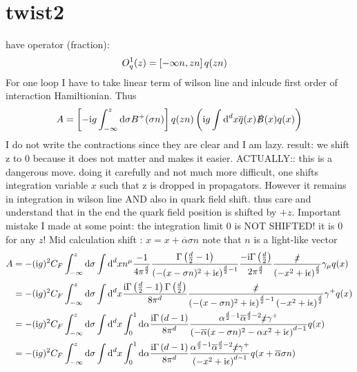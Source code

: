 \ifdefined\mainprogram{}
\else

\fi

\section{twist2}
have operator (fraction):
\begin{align}
O_q^{1}(z) 
&=
\left[-\infty n ,zn \right] q(zn)
\end{align}
For one loop I have to take linear term of wilson line and inlcude first order of interaction Hamiltionian. Thus
\begin{align}
	A=\left[-\text{i} g \int_{-\infty}^ {z} \text{d} \sigma B^+(\sigma n)\right] q(zn) \left(\text{i} g \int \text{d} ^d x \overline q(x) \slashed {B} (x) q(x)\right)
\end{align}
I do not write the contractions since they are clear and I am lazy. result: 
we shift z to 0 because it does not matter  and makes it easier. ACTUALLY:: this is a dangerous move. doing it carefully and not much more difficult, one shifts integration variable $x$ such that z is  dropped in propagators. However it remains in integration in wilson line AND also in quark field shift. thus care and understand that in the end the quark field position is shifted by $+z$. Important mistake I made at some point: the integration limit $0$ is NOT SHIFTED! it is $0$ for any $z$! Mid calculation shift : $x = x + \overline\alpha \sigma n$ note that $n$ is a light-like vector
\begin{align}
	A
	&=
	-(\text{i} g)^2C_F \int_{-\infty}^{z} \text{d} \sigma \int \text{d} ^d x n^\mu \frac{-1}{4\pi^{\frac{d}{2}}}\frac{\Gamma\left(\frac{d}{2}-1\right)}{\left(-(x-\sigma n)^2 + \text{i} \epsilon\right)^{\frac{d}{2}-1}}\frac{-\text{i} \Gamma\left(\frac{d}{2}\right)}{2\pi^{\frac{d}{2}}}\frac{\slashed x}{\left(-x^2+\text{i} \epsilon \right)^{\frac{d}{2}}}\gamma_\mu q(x)
	\\
	&=
	-(\text{i} g)^2C_F \int_{-\infty}^{z} \text{d} \sigma \int \text{d} ^d x \frac{\text{i}\Gamma\left(\frac{d}{2}-1\right) \Gamma\left(\frac{d}{2}\right)}{8\pi^{d}}\frac{\slashed x}{\left(-(x-\sigma n)^2 + \text{i} \epsilon\right)^{\frac{d}{2}-1}\left(-x^2+\text{i} \epsilon \right)^{\frac{d}{2}}}\gamma^+ q(x)
	\\
	&=
	-(\text{i} g)^2C_F \int_{-\infty}^{z} \text{d} \sigma \int \text{d} ^d x \int_0^1 \text{d} \alpha \frac{\text{i} \Gamma\left(d-1\right)}{8\pi^{d}}\frac{\alpha^{\frac{d}{2}-1} \overline \alpha^{\frac{d}{2}-2}\slashed x\gamma^+}{\left(-\overline \alpha(x-\sigma n)^2 -\alpha x^2+\text{i} \epsilon \right)^{d-1}} q(x)
	\\
	&=
	-(\text{i} g)^2C_F \int_{-\infty}^{z} \text{d} \sigma \int \text{d} ^d x \int_0^1 \text{d} \alpha \frac{\text{i} \Gamma\left(d-1\right)}{8\pi^{d}}\frac{\alpha^{\frac{d}{2}-1} \overline \alpha^{\frac{d}{2}-2}\slashed x\gamma^+}{\left(-x^2+\text{i} \epsilon\right)^{d-1}} q(x+\overline \alpha \sigma n )
\end{align}

